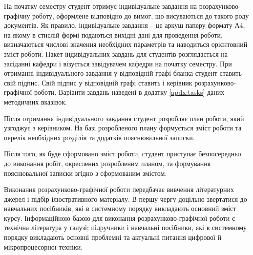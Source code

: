 На початку семестру студент отримує індивідуальне завдання на розрахунково-графічну роботу, оформлене відповідно до вимог, що висуваються до такого роду документів. Як правило, індивідуальне завдання -- це аркуш паперу формату А4, на якому в стислій формі подаються вихідні дані для проведення роботи, визначаються числові значення необхідних параметрів та наводиться орієнтовний зміст роботи. Пакет індивідуальних завдань для студентів розглядається на засіданні кафедри і візується завідувачем кафедри на початку семестру. При отриманні індивідуального завдання у відповідній графі бланка студент ставить свій підпис. Свій підпис у відповідній графі ставить і керівник розрахунково-графічної роботи. Варіанти завдань наведені в додатку \ref{apdx:tasks} даних методичних вказівок.

Після отримання індивідуального завдання студент розробляє план роботи, який узгоджує з керівником. На базі розробленого плану формується зміст роботи та перелік необхідних розділів та додатків пояснювальної записки.

Після того, як буде сформовано зміст роботи, студент приступає безпосередньо до виконання робіт, окреслених розробленим планом, та формування пояснювальної записки згідно з сформованим змістом.

Виконання розрахунково-графічної роботи передбачає вивчення літературних джерел і підбір ілюстративного матеріалу. В першу чергу доцільно звертатися до навчальних посібників, які в системному порядку викладають основний зміст курсу. Інформаційною базою для виконання розрахунково-графічної роботи є технічна література у галузі; підручники і навчальні посібники, які в системному порядку викладають основні проблемні та актуальні питання цифрової й мікропроцесорної техніки.

